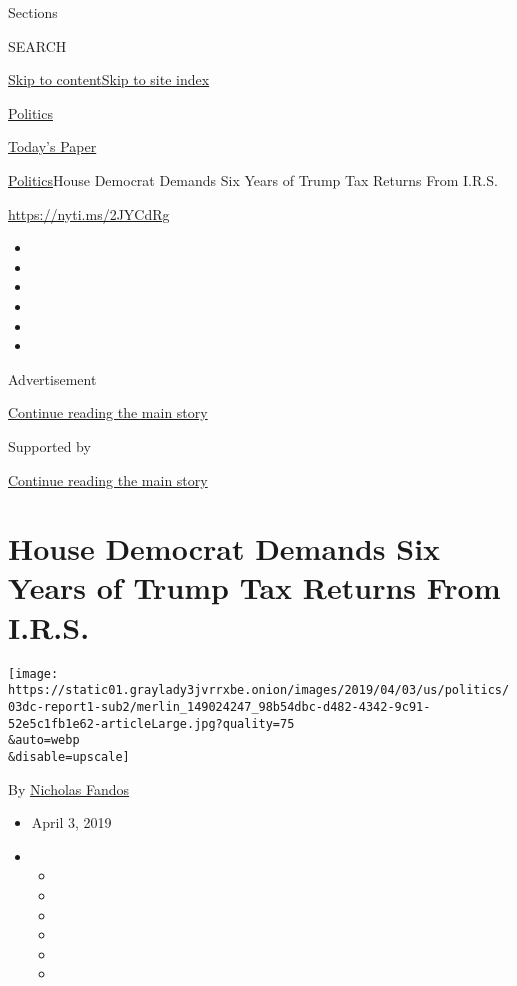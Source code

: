 Sections

SEARCH

\protect\hyperlink{site-content}{Skip to
content}\protect\hyperlink{site-index}{Skip to site index}

\href{https://www.nytimes3xbfgragh.onion/section/politics}{Politics}

\href{https://myaccount.nytimes3xbfgragh.onion/auth/login?response_type=cookie\&client_id=vi}{}

\href{https://www.nytimes3xbfgragh.onion/section/todayspaper}{Today's
Paper}

\href{/section/politics}{Politics}\textbar{}House Democrat Demands Six
Years of Trump Tax Returns From I.R.S.

\url{https://nyti.ms/2JYCdRg}

\begin{itemize}
\item
\item
\item
\item
\item
\item
\end{itemize}

Advertisement

\protect\hyperlink{after-top}{Continue reading the main story}

Supported by

\protect\hyperlink{after-sponsor}{Continue reading the main story}

\hypertarget{house-democrat-demands-six-years-of-trump-tax-returns-from-irs}{%
\section{House Democrat Demands Six Years of Trump Tax Returns From
I.R.S.}\label{house-democrat-demands-six-years-of-trump-tax-returns-from-irs}}

\texttt{[image: https://static01.graylady3jvrrxbe.onion/images/2019/04/03/us/politics/03dc-report1-sub2/merlin\_149024247\_98b54dbc-d482-4342-9c91-52e5c1fb1e62-articleLarge.jpg?quality=75\\\&auto=webp\\\&disable=upscale]}

By \href{https://www.nytimes3xbfgragh.onion/by/nicholas-fandos}{Nicholas
Fandos}

\begin{itemize}
\item
  April 3, 2019
\item
  \begin{itemize}
  \item
  \item
  \item
  \item
  \item
  \item
  \end{itemize}
\end{itemize}


